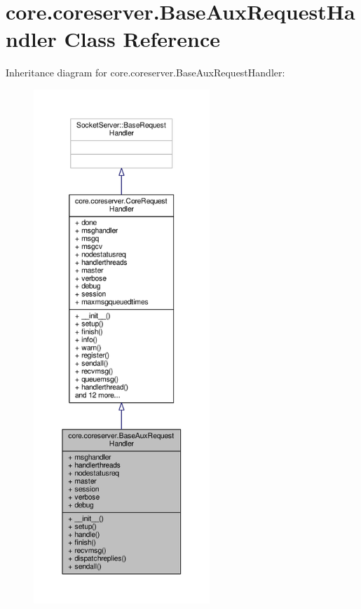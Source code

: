 \hypertarget{classcore_1_1coreserver_1_1_base_aux_request_handler}{\section{core.\+coreserver.\+Base\+Aux\+Request\+Handler Class Reference}
\label{classcore_1_1coreserver_1_1_base_aux_request_handler}
}


Inheritance diagram for core.\+coreserver.\+Base\+Aux\+Request\+Handler\+:
\nopagebreak
\begin{figure}[H]
\begin{center}
\leavevmode
\includegraphics[height=550pt]{classcore_1_1coreserver_1_1_base_aux_request_handler__inherit__graph}
\end{center}
\end{figure}


